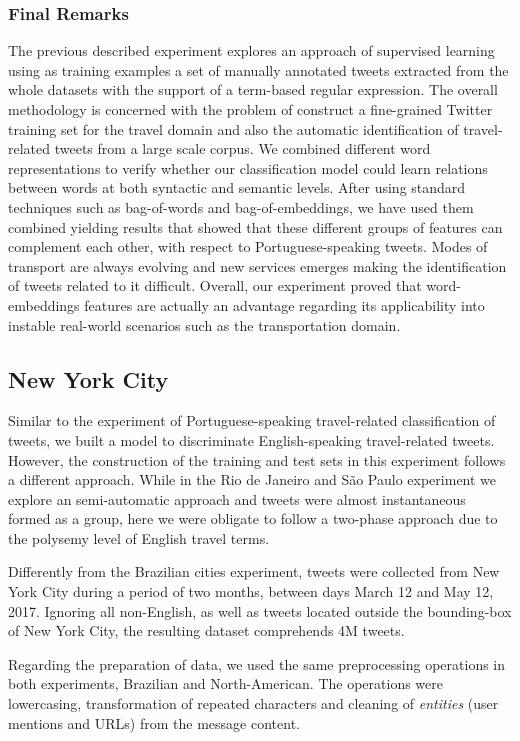 \subsubsection{Final Remarks}
The previous described experiment explores an approach of supervised learning using as training examples a set of manually annotated tweets extracted from the whole datasets with the support of a term-based regular expression. The overall methodology is concerned with the problem of construct a fine-grained Twitter training set for the travel domain and also the automatic identification of travel-related tweets from a large scale corpus. We combined different word representations to verify whether our classification model could learn relations between words at both syntactic and semantic levels. After using standard techniques such as bag-of-words and bag-of-embeddings, we have used them combined yielding results that showed that these different groups of features can complement each other, with respect to Portuguese-speaking tweets. Modes of transport are always evolving and new services emerges making the identification of tweets related to it difficult. Overall, our experiment proved that word-embeddings features are actually an advantage regarding its applicability into instable real-world scenarios such as the transportation domain. 

\subsection{New York City}
\label{subsec:new_york_city_experiment}

Similar to the experiment of Portuguese-speaking travel-related classification of tweets, we built a model to discriminate English-speaking travel-related tweets. However, the construction of the training and test sets in this experiment follows a different approach. While in the Rio de Janeiro and São Paulo experiment we explore an semi-automatic approach and tweets were almost instantaneous formed as a group, here we were obligate to follow a two-phase approach due to the polysemy level of English travel terms.

Differently from the Brazilian cities experiment, tweets were collected from New York City during a period of two months, between days March 12 and May 12, 2017. Ignoring all non-English, as well as tweets located outside the bounding-box of New York City, the resulting dataset comprehends 4M tweets.

Regarding the preparation of data, we used the same preprocessing operations in both experiments, Brazilian and North-American. The operations were lowercasing, transformation of repeated characters and cleaning of \emph{entities} (user mentions and URLs) from the message content.

